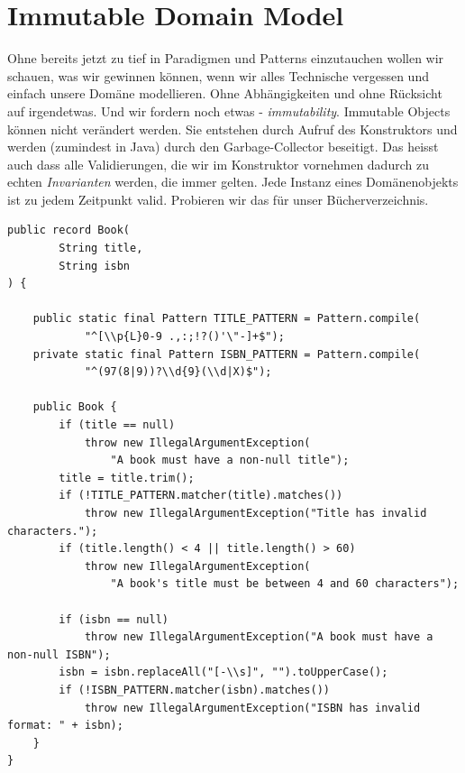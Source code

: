 \section{Immutable Domain Model}
Ohne bereits jetzt zu tief in Paradigmen und Patterns einzutauchen wollen
wir schauen, was wir gewinnen können, wenn wir alles Technische vergessen
und einfach unsere Domäne modellieren. Ohne Abhängigkeiten und ohne
Rücksicht auf irgendetwas. Und wir fordern noch etwas - \textit{immutability}.
Immutable Objects können nicht verändert werden. Sie entstehen durch
Aufruf des Konstruktors und werden (zumindest in Java) durch den
Garbage-Collector beseitigt. Das heisst auch dass alle Validierungen, 
die wir im Konstruktor vornehmen dadurch zu echten \textit{Invarianten}
werden, die immer gelten. Jede Instanz eines Domänenobjekts ist zu 
jedem Zeitpunkt valid. Probieren wir das für unser Bücherverzeichnis.


\begin{listing}[H]
\begin{verbatim}
public record Book(
        String title,
        String isbn
) {

    public static final Pattern TITLE_PATTERN = Pattern.compile(
            "^[\\p{L}0-9 .,:;!?()'\"-]+$");
    private static final Pattern ISBN_PATTERN = Pattern.compile(
            "^(97(8|9))?\\d{9}(\\d|X)$");

    public Book {
        if (title == null)
            throw new IllegalArgumentException(
                "A book must have a non-null title");
        title = title.trim();
        if (!TITLE_PATTERN.matcher(title).matches())
            throw new IllegalArgumentException("Title has invalid characters.");
        if (title.length() < 4 || title.length() > 60)
            throw new IllegalArgumentException(
                "A book's title must be between 4 and 60 characters");

        if (isbn == null)
            throw new IllegalArgumentException("A book must have a non-null ISBN");
        isbn = isbn.replaceAll("[-\\s]", "").toUpperCase();
        if (!ISBN_PATTERN.matcher(isbn).matches())
            throw new IllegalArgumentException("ISBN has invalid format: " + isbn);
    }
}
\end{verbatim}
\caption{Book als immutable Domain Object}
\label{lst:BookImmutable}
\end{listing}

